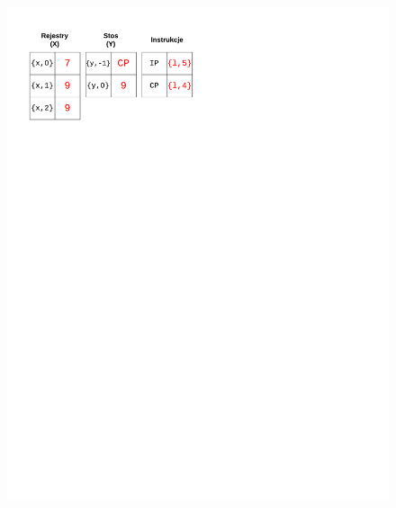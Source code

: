 \begin{figure}
\begin{multicols}{2}
\vspace{-4mm}
\begin{Figure}
 \centering
 \includegraphics[scale=0.65, clip, trim=0 215mm 110mm 0]{interpreter_max_6}
\label{fig:max6}
\end{Figure}


\end{multicols}
\end{figure}

